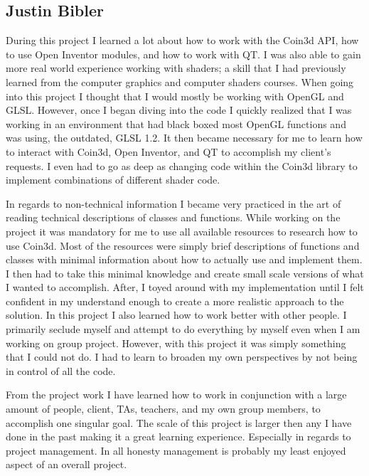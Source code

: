 \documentclass[10pt,journal,compsoc,draftclsnofoot]{IEEEtran}
\begin{document}
\begin{flushleft}
\subsection{Justin Bibler}
During this project I learned a lot about how to work with the Coin3d API, how to use Open Inventor modules, and how to work with QT.
I was also able to gain more real world experience working with shaders; a skill that I had previously learned from the computer graphics and computer shaders courses.
When going into this project I thought that I would mostly be working with OpenGL and GLSL.
However, once I began diving into the code I quickly realized that I was working in an environment that had black boxed most OpenGL functions and was using, the outdated, GLSL 1.2.
It then became necessary for me to learn how to interact with Coin3d, Open Inventor, and QT to accomplish my client's requests.
I even had to go as deep as changing code within the Coin3d library to implement combinations of different shader code.\par
\vspace{3mm}
In regards to non-technical information I became very practiced in the art of reading technical descriptions of classes and functions.
While working on the project it was mandatory for me to use all available resources to research how to use Coin3d.
Most of the resources were simply brief descriptions of functions and classes with minimal information about how to actually use and implement them.
I then had to take this minimal knowledge and create small scale versions of what I wanted to accomplish.
After, I toyed around with my implementation until I felt confident in my understand enough to create a more realistic approach to the solution.
In this project I also learned how to work better with other people.
I primarily seclude myself and attempt to do everything by myself even when I am working on group project.
However, with this project it was simply something that I could not do.
I had to learn to broaden my own perspectives by not being in control of all the code. \par
\vspace{3mm}
From the project work I have learned how to work in conjunction with a large amount of people, client, TAs, teachers, and my own group members, to accomplish one singular goal.
The scale of this project is larger then any I have done in the past making it a great learning experience.
Especially in regards to project management.
In all honesty management is probably my least enjoyed aspect of an overall project.

\end{flushleft}
\end{document}
